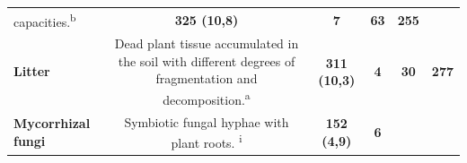 \documentclass[11pt]{article}
\begin{document}
\begin{longtable}[]{@{}lccccc@{}}
\begin{minipage}[t]{0.45\columnwidth}
capacities.\textsuperscript{b}\strut
\end{minipage} & \begin{minipage}[t]{0.14\columnwidth}\centering
\textbf{325 (10,8)}\strut
\end{minipage} & \begin{minipage}[t]{0.04\columnwidth}\centering
\textbf{7}\strut
\end{minipage} & \begin{minipage}[t]{0.04\columnwidth}\centering
\textbf{63}\strut
\end{minipage} & \begin{minipage}[t]{0.04\columnwidth}\centering
\textbf{255}\strut
\end{minipage}\tabularnewline
\begin{minipage}[t]{0.11\columnwidth}\raggedright
\textbf{Litter}\strut
\end{minipage} & \begin{minipage}[t]{0.45\columnwidth}\centering
Dead plant tissue accumulated in the soil with different degrees of
fragmentation and decomposition.\textsuperscript{a}\strut
\end{minipage} & \begin{minipage}[t]{0.14\columnwidth}\centering
\textbf{311 (10,3)}\strut
\end{minipage} & \begin{minipage}[t]{0.04\columnwidth}\centering
\textbf{4}\strut
\end{minipage} & \begin{minipage}[t]{0.04\columnwidth}\centering
\textbf{30}\strut
\end{minipage} & \begin{minipage}[t]{0.04\columnwidth}\centering
\textbf{277}\strut
\end{minipage}\tabularnewline
\begin{minipage}[t]{0.11\columnwidth}\raggedright
\textbf{Mycorrhizal fungi}\strut
\end{minipage} & \begin{minipage}[t]{0.45\columnwidth}\centering
Symbiotic fungal hyphae with plant roots. \textsuperscript{i}\strut
\end{minipage} & \begin{minipage}[t]{0.14\columnwidth}\centering
\textbf{152 (4,9)}\strut
\end{minipage} & \begin{minipage}[t]{0.04\columnwidth}\centering
\textbf{6}\strut
\end{minipage} & \begin{minipage}[t]{0.04\columnwidth}\centering

\end{minipage}
\end{longtable}
\end{document}
